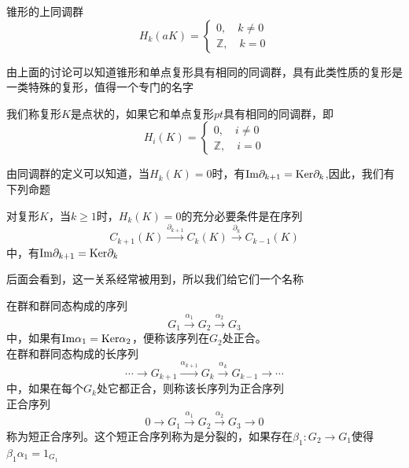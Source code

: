 \begin{corollary}
锥形的上同调群
\begin{equation*}
H_{k}(aK)=\left\{\begin{array}{cc}
         0,\quad k\neq 0  \\
         \mathbb{Z},\quad k=0 
    \end{array}\right.
\end{equation*}
\end{corollary}
由上面的讨论可以知道锥形和单点复形具有相同的同调群，具有此类性质的复形是一类特殊的复形，值得一个专门的名字
\begin{definition}
我们称复形$K$是点状的，如果它和单点复形$pt$具有相同的同调群，即
\begin{equation*}
H_{i}(K)=\left\{\begin{array}{cc}
     0,\quad i\neq 0  \\
     \mathbb{Z},\quad i=0 
\end{array}\right.
\end{equation*}
\end{definition}
由同调群的定义可以知道，当$H_{k}(K)=0$时，有${\rm Im}\partial_{k+1}={\rm Ker} \partial_{k}$,因此，我们有下列命题
\begin{proposition}
对复形$K$，当$k\geq 1$时，$H_{k}(K)=0$的充分必要条件是在序列
\begin{equation*}\label{eq1356}
    C_{k+1}(K)\xrightarrow{\partial_{k+1}}C_{k}(K)\xrightarrow{\partial_{k}}C_{k-1}(K)
\end{equation*}
中，有${\rm Im}\partial_{k+1}={\rm Ker} \partial_{k}$
\end{proposition}
后面会看到，这一关系经常被用到，所以我们给它们一个名称
\begin{definition}
在群和群同态构成的序列
\begin{equation*}
    G_{1}\xrightarrow{\alpha_{1}}G_{2}\xrightarrow{\alpha_{2}}G_{3}
\end{equation*}
中，如果有${\rm Im}\alpha_{1}={\rm Ker}\alpha_{2}$，便称该序列在$G_{2}$处正合。\\
在群和群同态构成的长序列
\begin{equation*}
    \cdots \rightarrow G_{k+1}\xrightarrow{\alpha_{k+1}}G_{k}\xrightarrow{\alpha_{k}}G_{k-1}\rightarrow\cdots
\end{equation*}
中，如果在每个$G_{k}$处它都正合，则称该长序列为正合序列\\
正合序列
\begin{equation*}
    0 \rightarrow G_{1}\xrightarrow{\alpha_{1}}G_{2}\xrightarrow{\alpha_{2}}G_{3}\rightarrow 0
\end{equation*}
称为短正合序列。这个短正合序列称为是分裂的，如果存在$\beta_{1}:G_{2}\rightarrow G_{1}$使得$\beta_{1}\alpha_{1}=1_{G_{1}}$
\end{definition}
